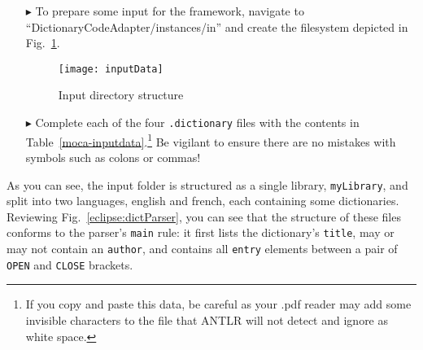 \begin{itemize}

\item[$\blacktriangleright$] To prepare some input for the framework, navigate to ``Dict\-ion\-ar\-y\-Code\-Adap\-ter\-/in\-stan\-ces\-/in'' and create the
filesystem depicted in \\ Fig.~\ref{eclipse:textDirectory}. 

\begin{figure}[htp]
\begin{center}
  \texttt{[image: inputData]}
  \caption{Input directory structure}
  \label{eclipse:textDirectory}
\end{center}
\end{figure}

\item[$\blacktriangleright$] Complete each of the four \texttt{.dictionary} files with the contents in Table~\ref{moca-inputdata}.\footnote{If you copy and
paste this data, be careful as your .pdf reader may add some invisible characters to the file that ANTLR will not detect and ignore as white space.} 
Be vigilant to ensure there are no mistakes with symbols such as colons or commas!

\end{itemize}

As you can see, the input folder is structured as a single library, \texttt{myLibrary}, and split into two languages, english and french, each containing
some dictionaries. Reviewing Fig.~\ref{eclipse:dictParser}, you can see that the structure of these files conforms to the parser's \texttt{main} rule: it
first lists the dictionary's \texttt{title}, may or may not contain an \texttt{author}, and contains all \texttt{entry} elements between a pair of \texttt{OPEN}
and \texttt{CLOSE} brackets.

